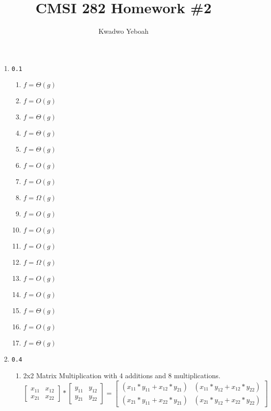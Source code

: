 \documentclass[12pt]{article}
\title{CMSI 282 Homework \#2}
\author{Kwadwo Yeboah}
\begin{document}
\maketitle
\begin{enumerate}
	\item \texttt{0.1}
	\begin{enumerate}
    \item \(f = \Theta(g)\)
    \item \(f = O(g)\)
    \item \(f = \Theta(g)\)
    \item \(f = \Theta(g)\) 
    \item \(f = \Theta(g)\)	
    \item \(f = O(g)\) 
    \item \(f = O(g)\) %
    \item \(f = \Omega(g)\)
    \item \(f = O(g)\)
    \item \(f = O(g)\)
    \item \(f = O(g)\)
	\item \(f = \Omega(g)\)
    \item \(f = O(g)\)	%
    \item \(f = O(g)\)
   	\item \(f = \Theta(g)\)	%
   	\item \(f = O(g)\) 
   	\item \(f = \Theta(g)\)

   	 
  	\end{enumerate}
\item \texttt{0.4}
	\begin{enumerate}
	 \item 2x2 Matrix Multiplication with 4 additions and 8 multiplications.
	 \[\begin{bmatrix}
    x_{11} & x_{12} \\
    x_{21} & x_{22} 
    
\end{bmatrix} 
*
\begin{bmatrix}
    y_{11} & y_{12} \\
    y_{21} & y_{22} 
    
\end{bmatrix} 
=
\begin{bmatrix}
    ({x_{11} * y_{11} + {x_{12} * y_{21} }}) & ({x_{11} * y_{12} + {x_{12} * y_{22} }}) \\
    ({x_{21} * y_{11} + {x_{22} * y_{21} }}) & ({x_{21} * y_{12} + {x_{22} * y_{22} }}) 
    

\end{bmatrix}\]
\end{enumerate}
\end{enumerate}
\end{document}
